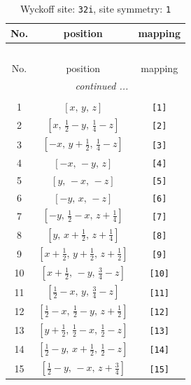 \documentclass[fleqn,8pt]{jsarticle}
\begin{document}
\renewcommand{\arraystretch}{1.2}
\begin{longtable}{ccc}
\caption{Wyckoff site: {\tt 32i}, site symmetry: {\tt 1}}
 \\
 \hline \hline
No. & position & mapping \\ \hline \endfirsthead

\multicolumn{2}{l}{\tablename\ \thetable{}} \\
 \hline \hline
No. & position & mapping \\ \hline \endhead

 \hline \hline
\multicolumn{2}{r}{\footnotesize\it continued ...} \\ \endfoot

 \hline \hline
\multicolumn{2}{r}{} \\ \endlastfoot

1 & $\left[ x,\, y,\, z \right]$ & {\tt [1]} \\ \hline
2 & $\left[ x,\, \frac{1}{2} - y,\, \frac{1}{4} - z \right]$ & {\tt [2]} \\ \hline
3 & $\left[ - x,\, y + \frac{1}{2},\, \frac{1}{4} - z \right]$ & {\tt [3]} \\ \hline
4 & $\left[ - x,\, - y,\, z \right]$ & {\tt [4]} \\ \hline
5 & $\left[ y,\, - x,\, - z \right]$ & {\tt [5]} \\ \hline
6 & $\left[ - y,\, x,\, - z \right]$ & {\tt [6]} \\ \hline
7 & $\left[ - y,\, \frac{1}{2} - x,\, z + \frac{1}{4} \right]$ & {\tt [7]} \\ \hline
8 & $\left[ y,\, x + \frac{1}{2},\, z + \frac{1}{4} \right]$ & {\tt [8]} \\ \hline
9 & $\left[ x + \frac{1}{2},\, y + \frac{1}{2},\, z + \frac{1}{2} \right]$ & {\tt [9]} \\ \hline
10 & $\left[ x + \frac{1}{2},\, - y,\, \frac{3}{4} - z \right]$ & {\tt [10]} \\ \hline
11 & $\left[ \frac{1}{2} - x,\, y,\, \frac{3}{4} - z \right]$ & {\tt [11]} \\ \hline
12 & $\left[ \frac{1}{2} - x,\, \frac{1}{2} - y,\, z + \frac{1}{2} \right]$ & {\tt [12]} \\ \hline
13 & $\left[ y + \frac{1}{2},\, \frac{1}{2} - x,\, \frac{1}{2} - z \right]$ & {\tt [13]} \\ \hline
14 & $\left[ \frac{1}{2} - y,\, x + \frac{1}{2},\, \frac{1}{2} - z \right]$ & {\tt [14]} \\ \hline
15 & $\left[ \frac{1}{2} - y,\, - x,\, z + \frac{3}{4} \right]$ & {\tt [15]} \\ \hline

\end{longtable}
\end{document}
